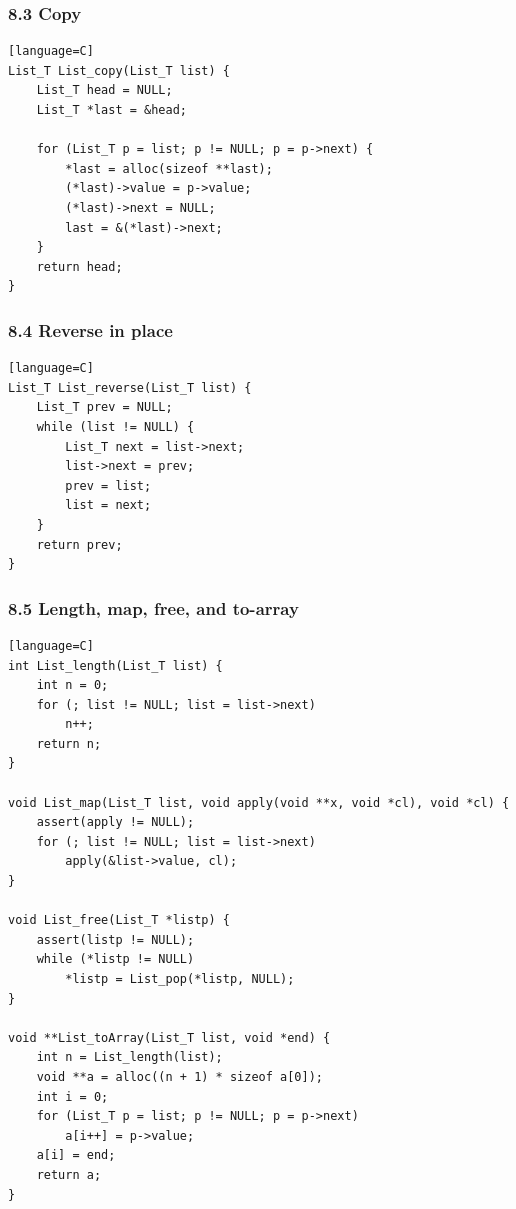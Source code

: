 \documentclass[11pt]{article}
\begin{document}
\subsubsection{8.3 Copy}\label{copy}

\begin{verbatim}[language=C]
List_T List_copy(List_T list) {
    List_T head = NULL;
    List_T *last = &head;

    for (List_T p = list; p != NULL; p = p->next) {
        *last = alloc(sizeof **last);
        (*last)->value = p->value;
        (*last)->next = NULL;
        last = &(*last)->next;
    }
    return head;
}
\end{verbatim}

\subsubsection{8.4 Reverse in place}\label{reverse-in-place}

\begin{verbatim}[language=C]
List_T List_reverse(List_T list) {
    List_T prev = NULL;
    while (list != NULL) {
        List_T next = list->next;
        list->next = prev;
        prev = list;
        list = next;
    }
    return prev;
}
\end{verbatim}

\subsubsection{8.5 Length, map, free, and to-array}\label{length-map-free-and-to-array}

\begin{verbatim}[language=C]
int List_length(List_T list) {
    int n = 0;
    for (; list != NULL; list = list->next)
        n++;
    return n;
}

void List_map(List_T list, void apply(void **x, void *cl), void *cl) {
    assert(apply != NULL);
    for (; list != NULL; list = list->next)
        apply(&list->value, cl);
}

void List_free(List_T *listp) {
    assert(listp != NULL);
    while (*listp != NULL)
        *listp = List_pop(*listp, NULL);
}

void **List_toArray(List_T list, void *end) {
    int n = List_length(list);
    void **a = alloc((n + 1) * sizeof a[0]);
    int i = 0;
    for (List_T p = list; p != NULL; p = p->next)
        a[i++] = p->value;
    a[i] = end;
    return a;
}
\end{verbatim}
\end{document}
